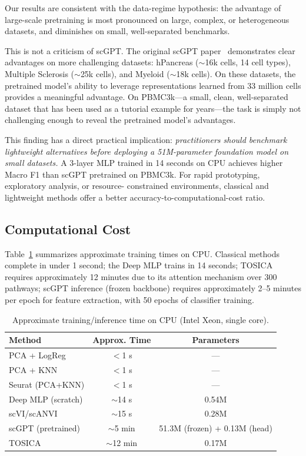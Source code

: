 \documentclass{article}
\begin{document}
Our results are consistent with the data-regime hypothesis: the advantage of large-scale
pretraining is most pronounced on large, complex, or heterogeneous datasets, and diminishes
on small, well-separated benchmarks.

This is not a criticism of scGPT. The original scGPT paper~\citep{cui2024scgpt}
demonstrates clear advantages on more challenging datasets: hPancreas ($\sim$16k cells,
14 cell types), Multiple Sclerosis ($\sim$25k cells), and Myeloid ($\sim$18k cells).
On these datasets, the pretrained model's ability to leverage representations learned
from 33 million cells provides a meaningful advantage. On PBMC3k---a small, clean,
well-separated dataset that has been used as a tutorial example for years---the task is
simply not challenging enough to reveal the pretrained model's advantages.

This finding has a direct practical implication: \emph{practitioners should benchmark
lightweight alternatives before deploying a 51M-parameter foundation model on small
datasets.} A 3-layer MLP trained in 14 seconds on CPU achieves higher Macro F1 than
scGPT pretrained on PBMC3k. For rapid prototyping, exploratory analysis, or resource-
constrained environments, classical and lightweight methods offer a better
accuracy-to-computational-cost ratio.

\subsection{Computational Cost}
\label{sec:cost}

Table~\ref{tab:cost} summarizes approximate training times on CPU. Classical methods
complete in under 1 second; the Deep MLP trains in 14 seconds; TOSICA requires
approximately 12 minutes due to its attention mechanism over 300 pathways; scGPT
inference (frozen backbone) requires approximately 2--5 minutes per epoch for feature
extraction, with 50 epochs of classifier training.

\begin{table}[h]
\centering
\caption{Approximate training/inference time on CPU (Intel Xeon, single core).}
\label{tab:cost}
\small
\begin{tabular}{lcc}
\toprule
\textbf{Method} & \textbf{Approx. Time} & \textbf{Parameters} \\
\midrule
PCA + LogReg      & $<$1 s   & ---         \\
PCA + KNN         & $<$1 s   & ---         \\
Seurat (PCA+KNN)  & $<$1 s   & ---         \\
Deep MLP (scratch)& $\sim$14 s & 0.54M     \\
scVI/scANVI       & $\sim$15 s & 0.28M     \\
scGPT (pretrained)& $\sim$5 min & 51.3M (frozen) + 0.13M (head) \\
TOSICA            & $\sim$12 min & 0.17M   \\
\bottomrule
\end{tabular}
\end{table}
\end{document}
